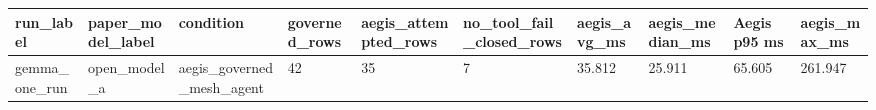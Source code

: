 \begin{tabular}{llllllllll}
 \hline
run\_label & paper\_model\_label & condition & governed\_rows & aegis\_attempted\_rows & no\_tool\_fail\_closed\_rows & aegis\_avg\_ms & aegis\_median\_ms & Aegis p95 ms & aegis\_max\_ms \\
 \hline
gemma\_one\_run & open\_model\_a & aegis\_governed\_mesh\_agent & 42 & 35 & 7 & 35.812 & 25.911 & 65.605 & 261.947 \\
 \hline
\end{tabular}
